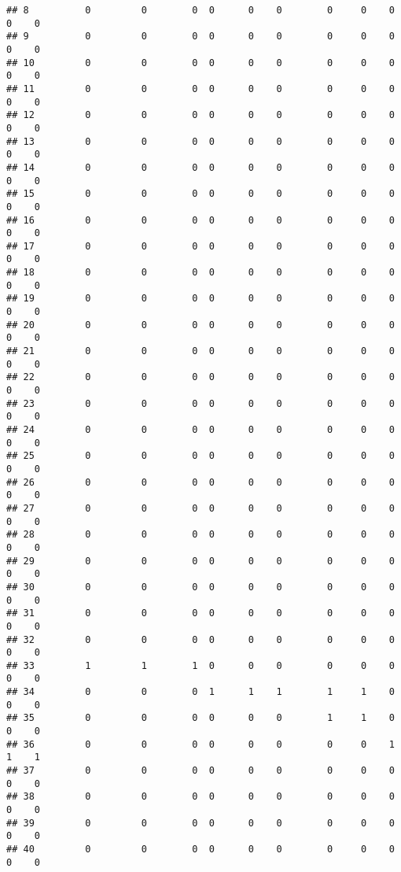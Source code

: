 \documentclass[
]{article}
\begin{document}
\begin{verbatim}
## 8          0         0        0  0      0    0        0     0    0    0    0
## 9          0         0        0  0      0    0        0     0    0    0    0
## 10         0         0        0  0      0    0        0     0    0    0    0
## 11         0         0        0  0      0    0        0     0    0    0    0
## 12         0         0        0  0      0    0        0     0    0    0    0
## 13         0         0        0  0      0    0        0     0    0    0    0
## 14         0         0        0  0      0    0        0     0    0    0    0
## 15         0         0        0  0      0    0        0     0    0    0    0
## 16         0         0        0  0      0    0        0     0    0    0    0
## 17         0         0        0  0      0    0        0     0    0    0    0
## 18         0         0        0  0      0    0        0     0    0    0    0
## 19         0         0        0  0      0    0        0     0    0    0    0
## 20         0         0        0  0      0    0        0     0    0    0    0
## 21         0         0        0  0      0    0        0     0    0    0    0
## 22         0         0        0  0      0    0        0     0    0    0    0
## 23         0         0        0  0      0    0        0     0    0    0    0
## 24         0         0        0  0      0    0        0     0    0    0    0
## 25         0         0        0  0      0    0        0     0    0    0    0
## 26         0         0        0  0      0    0        0     0    0    0    0
## 27         0         0        0  0      0    0        0     0    0    0    0
## 28         0         0        0  0      0    0        0     0    0    0    0
## 29         0         0        0  0      0    0        0     0    0    0    0
## 30         0         0        0  0      0    0        0     0    0    0    0
## 31         0         0        0  0      0    0        0     0    0    0    0
## 32         0         0        0  0      0    0        0     0    0    0    0
## 33         1         1        1  0      0    0        0     0    0    0    0
## 34         0         0        0  1      1    1        1     1    0    0    0
## 35         0         0        0  0      0    0        1     1    0    0    0
## 36         0         0        0  0      0    0        0     0    1    1    1
## 37         0         0        0  0      0    0        0     0    0    0    0
## 38         0         0        0  0      0    0        0     0    0    0    0
## 39         0         0        0  0      0    0        0     0    0    0    0
## 40         0         0        0  0      0    0        0     0    0    0    0

\end{verbatim}
\end{document}
